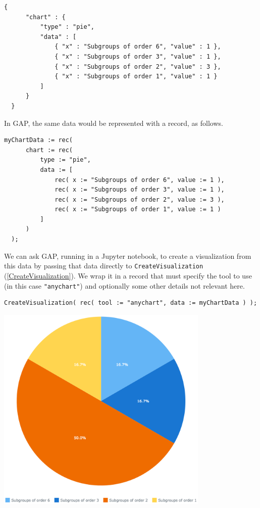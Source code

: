 \documentclass[a4paper,11pt]{report}
\begin{document}
{{{ 
\begin{Verbatim}[commandchars=!@|,fontsize=\small,frame=single,label=Example]
  {
      "chart" : {
          "type" : "pie",
          "data" : [
              { "x" : "Subgroups of order 6", "value" : 1 },
              { "x" : "Subgroups of order 3", "value" : 1 },
              { "x" : "Subgroups of order 2", "value" : 3 },
              { "x" : "Subgroups of order 1", "value" : 1 }
          ]
      }
  }
\end{Verbatim}
 

 In \textsf{GAP}, the same data would be represented with a record, as follows. 

 
\begin{Verbatim}[commandchars=!@|,fontsize=\small,frame=single,label=Example]
  myChartData := rec(
      chart := rec(
          type := "pie",
          data := [
              rec( x := "Subgroups of order 6", value := 1 ),
              rec( x := "Subgroups of order 3", value := 1 ),
              rec( x := "Subgroups of order 2", value := 3 ),
              rec( x := "Subgroups of order 1", value := 1 )
          ]
      )
  );
\end{Verbatim}
 

 We can ask \textsf{GAP}, running in a Jupyter notebook, to create a visualization from this data by
passing that data directly to \texttt{CreateVisualization} (\ref{CreateVisualization}). We wrap it in a record that must specify the tool to use (in this case \texttt{"anychart"}) and optionally some other details not relevant here. 

 
\begin{Verbatim}[commandchars=!@|,fontsize=\small,frame=single,label=Example]
  CreateVisualization( rec( tool := "anychart", data := myChartData ) );
\end{Verbatim}
 

 
\begin{center}
\includegraphics[width=4in]{anychart-example.png}
\end{center}
   

}}}
\end{document}
